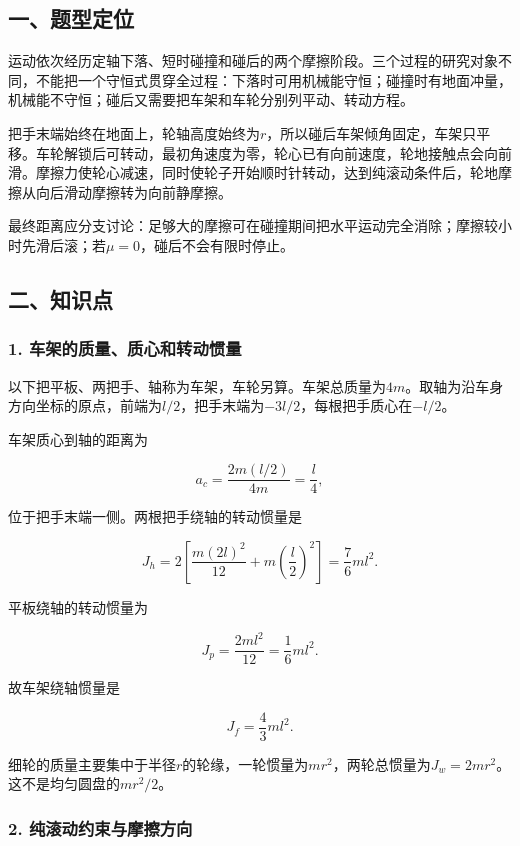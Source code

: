 \documentclass[12pt,a4paper,fontset=fandol]{ctexart}
\begin{document}
\subsection{一、题型定位}\label{ux4e00ux9898ux578bux5b9aux4f4d-1}

运动依次经历定轴下落、短时碰撞和碰后的两个摩擦阶段。三个过程的研究对象不同，不能把一个守恒式贯穿全过程：下落时可用机械能守恒；碰撞时有地面冲量，机械能不守恒；碰后又需要把车架和车轮分别列平动、转动方程。

把手末端始终在地面上，轮轴高度始终为\(r\)，所以碰后车架倾角固定，车架只平移。车轮解锁后可转动，最初角速度为零，轮心已有向前速度，轮地接触点会向前滑。摩擦力使轮心减速，同时使轮子开始顺时针转动，达到纯滚动条件后，轮地摩擦从向后滑动摩擦转为向前静摩擦。

最终距离应分支讨论：足够大的摩擦可在碰撞期间把水平运动完全消除；摩擦较小时先滑后滚；若\(\mu=0\)，碰后不会有限时停止。

\subsection{二、知识点}\label{ux4e8cux77e5ux8bc6ux70b9-1}

\subsubsection{1.
车架的质量、质心和转动惯量}\label{ux8f66ux67b6ux7684ux8d28ux91cfux8d28ux5fc3ux548cux8f6cux52a8ux60efux91cf}

以下把平板、两把手、轴称为车架，车轮另算。车架总质量为\(4m\)。取轴为沿车身方向坐标的原点，前端为\(l/2\)，把手末端为\(-3l/2\)，每根把手质心在\(-l/2\)。

车架质心到轴的距离为

\[
a_c=\frac{2m(l/2)}{4m}=\frac l4,
\]

位于把手末端一侧。两根把手绕轴的转动惯量是

\[
J_h=2\left[\frac{m(2l)^2}{12}+m\left(\frac l2\right)^2\right]
=\frac76ml^2.
\]

平板绕轴的转动惯量为

\[
J_p=\frac{2ml^2}{12}=\frac16ml^2.
\]

故车架绕轴惯量是

\[
\boxed{J_f=\frac43ml^2}.
\]

细轮的质量主要集中于半径\(r\)的轮缘，一轮惯量为\(mr^2\)，两轮总惯量为\(J_w=2mr^2\)。这不是均匀圆盘的\(m r^2/2\)。

\subsubsection{2.
纯滚动约束与摩擦方向}\label{ux7eafux6edaux52a8ux7ea6ux675fux4e0eux6469ux64e6ux65b9ux5411}
\end{document}
